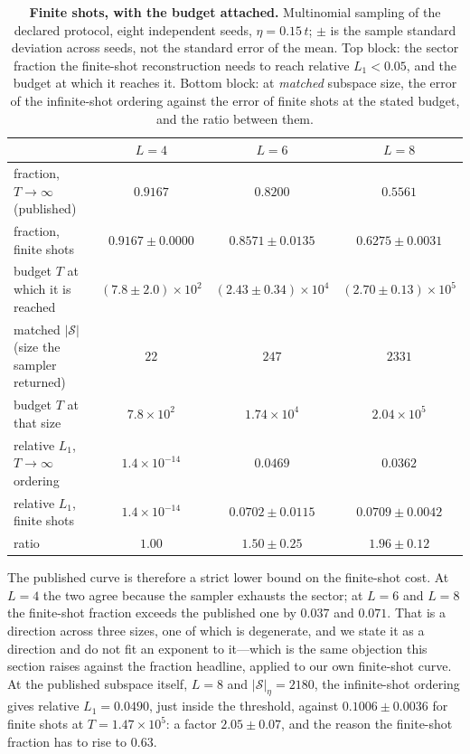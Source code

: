 \begin{table}[tp]\centering\small
\caption{\textbf{Finite shots, with the budget attached.} Multinomial sampling of the declared
protocol, eight independent seeds, $\eta=0.15\,t$; $\pm$ is the sample standard deviation across
seeds, not the standard error of the mean. Top block: the sector fraction the finite-shot
reconstruction needs to reach relative $L_1<0.05$, and the budget at which it reaches it. Bottom
block: at \emph{matched} subspace size, the error of the infinite-shot ordering against the error of
finite shots at the stated budget, and the ratio between them.}\label{tab:finiteshot}
\begin{tabular}{lccc}
\toprule
 & $L=4$ & $L=6$ & $L=8$\\
\midrule
fraction, $T\to\infty$ (published)     & $0.9167$ & $0.8200$ & $0.5561$\\
fraction, finite shots                 & $0.9167\pm0.0000$ & $0.8571\pm0.0135$ & $0.6275\pm0.0031$\\
budget $T$ at which it is reached      & $(7.8\pm2.0)\times10^{2}$ & $(2.43\pm0.34)\times10^{4}$ & $(2.70\pm0.13)\times10^{5}$\\
\midrule
matched $|\mathcal S|$ (size the sampler returned) & $22$ & $247$ & $2331$\\
budget $T$ at that size                & $7.8\times10^{2}$ & $1.74\times10^{4}$ & $2.04\times10^{5}$\\
relative $L_1$, $T\to\infty$ ordering  & $1.4\times10^{-14}$ & $0.0469$ & $0.0362$\\
relative $L_1$, finite shots           & $1.4\times10^{-14}$ & $0.0702\pm0.0115$ & $0.0709\pm0.0042$\\
ratio                                  & $1.00$ & $1.50\pm0.25$ & $1.96\pm0.12$\\
\bottomrule
\end{tabular}
\end{table}

The published curve is therefore a strict lower bound on the finite-shot cost. At $L=4$ the two agree
because the sampler exhausts the sector; at $L=6$ and $L=8$ the finite-shot fraction exceeds the
published one by $0.037$ and $0.071$. That is a direction across three sizes, one of which is
degenerate, and we state it as a direction and do not fit an exponent to it---which is the same
objection this section raises against the fraction headline, applied to our own finite-shot curve. At the
published subspace itself, $L=8$ and $|\mathcal S|_\eta=2180$, the infinite-shot ordering gives
relative $L_1=0.0490$, just inside the threshold, against $0.1006\pm0.0036$ for finite shots at
$T=1.47\times10^{5}$: a factor $2.05\pm0.07$, and the reason the finite-shot fraction has to rise to
$0.63$.

